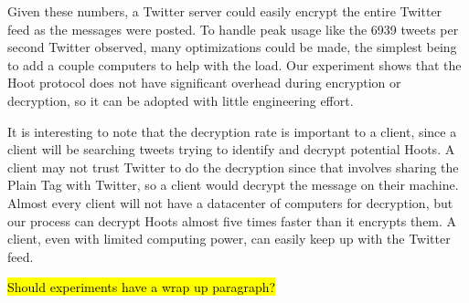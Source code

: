 Given these numbers, a Twitter server could easily encrypt the entire Twitter feed as the messages were posted. To handle peak usage like the 6939 tweets per second Twitter observed, many optimizations could be made, the simplest being to add a couple computers to help with the load. Our experiment shows that the Hoot protocol does not have significant overhead during encryption or decryption, so it can be adopted with little engineering effort.

It is interesting to note that the decryption rate is important to a client, since a client will be searching tweets trying to identify and decrypt potential Hoots. A client may not trust Twitter to do the decryption since that involves sharing the Plain Tag with Twitter, so a client would decrypt the message on their machine. Almost every client will not have a datacenter of computers for decryption, but our  process can decrypt Hoots almost five times faster than it encrypts them. A client, even with limited computing power, can easily keep up with the Twitter feed.

\hl{Should experiments have a wrap up paragraph?}